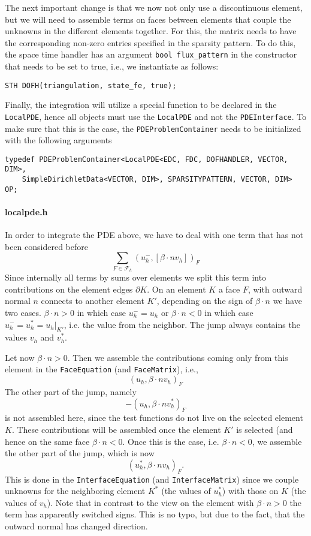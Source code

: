 The next important change is that we now not only use a discontinuous element, but we will need to assemble 
terms on faces between elements that couple the unknowns in the different elements together. For this,
the matrix needs to have the corresponding non-zero entries specified in the sparsity pattern.  
To do this, the space time handler has an argument \texttt{bool flux\_pattern} in the constructor that needs to be set to true, i.e., we instantiate as follows: 
\begin{verbatim}
STH DOFH(triangulation, state_fe, true);
\end{verbatim}

Finally, the integration will utilize a special function to be declared in the \texttt{LocalPDE}, 
hence all objects must use the \texttt{LocalPDE}
and not the \texttt{PDEInterface}.
To make sure that this is the case, the \texttt{PDEProblemContainer} needs to be initialized with the following arguments
\begin{verbatim}
typedef PDEProblemContainer<LocalPDE<EDC, FDC, DOFHANDLER, VECTOR, DIM>,
    SimpleDirichletData<VECTOR, DIM>, SPARSITYPATTERN, VECTOR, DIM> OP;
\end{verbatim}

\paragraph{localpde.h}
In order to integrate the PDE above, we have to deal with one term that has not been considered before
\[
 \sum_{F \in \mathcal F_h} (u_h^-,[\beta \cdot n v_h])_F 
\]
Since internally all terms by sums over elements we split this term into contributions on the 
element edges $\partial K$. On an element $K$ a face $F$, with outward normal $n$ 
connects to another element $K'$, depending on the sign of $\beta \cdot n$ we have two cases. 
$\beta \cdot n > 0$ in which case $u^-_h = u_h$ or $\beta \cdot n < 0$ in which case $u^-_h = u_h^* = u_h\lvert_{K'}$, i.e.
the value from the neighbor. The jump always contains the values $v_h$ and $v_h^*$. 

Let now $\beta \cdot n > 0$. Then we assemble the contributions coming only from this element in the \texttt{FaceEquation} 
(and \texttt{FaceMatrix}),
i.e.,
\[
 (u_h,\beta \cdot n v_h)_F
\]
The other part of the jump, namely 
\[
 -(u_h,\beta \cdot n v_h^*)_F
\]
is not assembled here, since the test functions do not live on the selected element $K$. These contributions will
be assembled once the element $K'$ is selected (and hence on the same face $\beta \cdot n < 0$.
Once this is the case, i.e. $\beta \cdot n < 0$, we assemble the other part of the jump,
which is now 
\[
(u_h^*,\beta \cdot n v_h)_F.
\]
This is done in the \texttt{InterfaceEquation} (and \texttt{InterfaceMatrix}) since we couple unknowns for the neighboring element $K^*$ (the values of $u_h^*$) with those on $K$ (the values of $v_h$). Note that in contrast to the view on the element with 
$\beta \cdot n > 0$ the term has apparently switched signs. This is no typo, but due to the fact, that the outward normal 
has changed direction.

